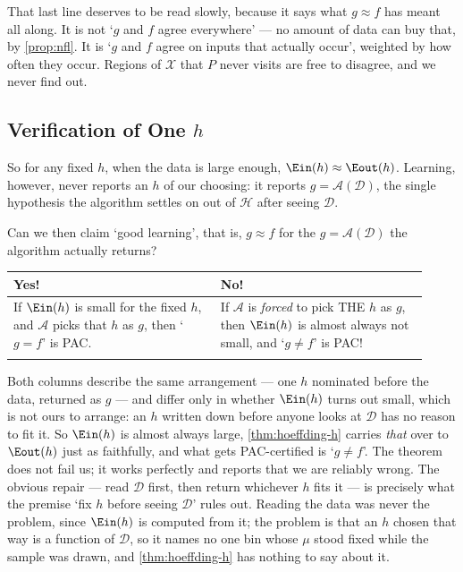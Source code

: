 That last line deserves to be read slowly, because it says what \(g \approx f\)
has meant all along. It is not `\(g\) and \(f\) agree everywhere' --- no amount
of data can buy that, by \autoref{prop:nfl}. It is `\(g\) and \(f\) agree on
inputs that actually occur', weighted by how often they occur. Regions of
\(\mathcal{X}\) that \(P\) never visits are free to disagree, and we never find
out.

\subsection{Verification of One \texorpdfstring{\(h\)}{h}}

So for any fixed \(h\), when the data is large enough, \(\Ein(h) \approx
\Eout(h)\). Learning, however, never reports an \(h\) of our choosing: it
reports \(g = \mathcal{A}(\mathcal{D})\), the single hypothesis the algorithm
settles on out of \(\mathcal{H}\) after seeing \(\mathcal{D}\).

\begin{question}
    Can we then claim `good learning', that is, \(g \approx f\) for the
    \(g = \mathcal{A}(\mathcal{D})\) the algorithm actually returns?
\end{question}

\begin{center}
    \begin{tabular}{@{}p{0.46\linewidth}p{0.46\linewidth}@{}}
        \toprule
        \textbf{Yes!} & \textbf{No!}\\
        \midrule
        If \(\Ein(h)\) is small for the fixed \(h\), and \(\mathcal{A}\) picks
        that \(h\) as \(g\), then `\(g = f\)' is PAC. &
        If \(\mathcal{A}\) is \emph{forced} to pick THE \(h\) as \(g\), then
        \(\Ein(h)\) is almost always not small, and `\(g \neq f\)' is PAC!\\
        \addlinespace[3pt]
        \bottomrule
    \end{tabular}
\end{center}

Both columns describe the same arrangement --- one \(h\) nominated before the
data, returned as \(g\) --- and differ only in whether \(\Ein(h)\) turns out
small, which is not ours to arrange: an \(h\) written down before anyone looks
at \(\mathcal{D}\) has no reason to fit it. So \(\Ein(h)\) is almost always
large, \autoref{thm:hoeffding-h} carries \emph{that} over to \(\Eout(h)\) just
as faithfully, and what gets PAC-certified is `\(g \neq f\)'. The theorem does
not fail us; it works perfectly and reports that we are reliably wrong. The
obvious repair --- read \(\mathcal{D}\) first, then return whichever \(h\) fits
it --- is precisely what the premise `fix \(h\) before seeing \(\mathcal{D}\)'
rules out. Reading the data was never the problem, since \(\Ein(h)\) is computed
from it; the problem is that an \(h\) chosen that way is a function of
\(\mathcal{D}\), so it names no one bin whose \(\mu\) stood fixed while the
sample was drawn, and \autoref{thm:hoeffding-h} has nothing to say about it.

